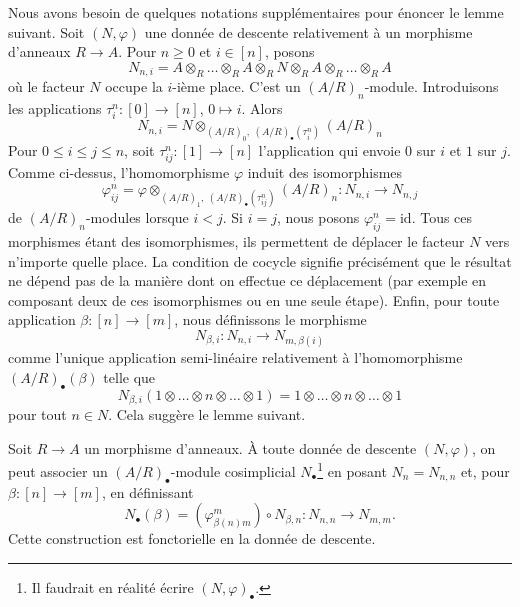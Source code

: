 \medskip\noindent
Nous avons besoin de quelques notations supplémentaires pour énoncer le lemme
suivant. Soit $(N, \varphi)$ une donnée de descente relativement à un
morphisme d'anneaux $R \to A$. Pour $n \geq 0$ et $i \in [n]$, posons
$$
N_{n, i} =
A \otimes_R
\ldots
\otimes_R A \otimes_R N \otimes_R A \otimes_R
\ldots
\otimes_R A
$$
où le facteur $N$ occupe la $i$-ième place. C'est un $(A/R)_n$-module.
Introduisons les applications $\tau^n_i : [0] \to [n]$, $0 \mapsto i$.
Alors
$$
N_{n, i} = N \otimes_{(A/R)_0, \ (A/R)_\bullet(\tau^n_i)} (A/R)_n
$$
Pour $0 \leq i \leq j \leq n$, soit
$\tau^n_{ij} : [1] \to [n]$ l'application qui envoie $0$ sur $i$ et $1$ sur
$j$. Comme ci-dessus, l'homomorphisme $\varphi$ induit des isomorphismes
$$
\varphi^n_{ij}
=
\varphi \otimes_{(A/R)_1, \ (A/R)_\bullet(\tau^n_{ij})} (A/R)_n :
N_{n, i} \longrightarrow N_{n, j}
$$
de $(A/R)_n$-modules lorsque $i < j$. Si $i = j$, nous posons
$\varphi^n_{ij} = \text{id}$. Tous ces morphismes étant des isomorphismes, ils
permettent de déplacer le facteur $N$ vers n'importe quelle place. La
condition de cocycle signifie précisément que le résultat ne dépend pas de la
manière dont on effectue ce déplacement (par exemple en composant deux de ces
isomorphismes ou en une seule étape). Enfin, pour toute application
$\beta : [n] \to [m]$, nous définissons le morphisme
$$
N_{\beta, i} : N_{n, i} \to N_{m, \beta(i)}
$$
comme l'unique application semi-linéaire relativement à l'homomorphisme
$(A/R)_\bullet(\beta)$ telle que
$$
N_{\beta, i}(1 \otimes \ldots \otimes n \otimes \ldots \otimes 1)
=
1 \otimes \ldots \otimes n \otimes \ldots \otimes 1
$$
pour tout $n \in N$. Cela suggère le lemme suivant.

\begin{lemma}
\label{lemma-descent-datum-cosimplicial}
Soit $R \to A$ un morphisme d'anneaux. À toute donnée de descente
$(N, \varphi)$, on peut associer un $(A/R)_\bullet$-module cosimplicial
$N_\bullet$\footnote{Il faudrait en réalité écrire
$(N, \varphi)_\bullet$.} en posant $N_n = N_{n, n}$ et, pour
$\beta : [n] \to [m]$, en définissant
$$
N_\bullet(\beta) = (\varphi^m_{\beta(n)m}) \circ N_{\beta, n} :
N_{n, n} \longrightarrow N_{m, m}.
$$
Cette construction est fonctorielle en la donnée de descente.
\end{lemma}

